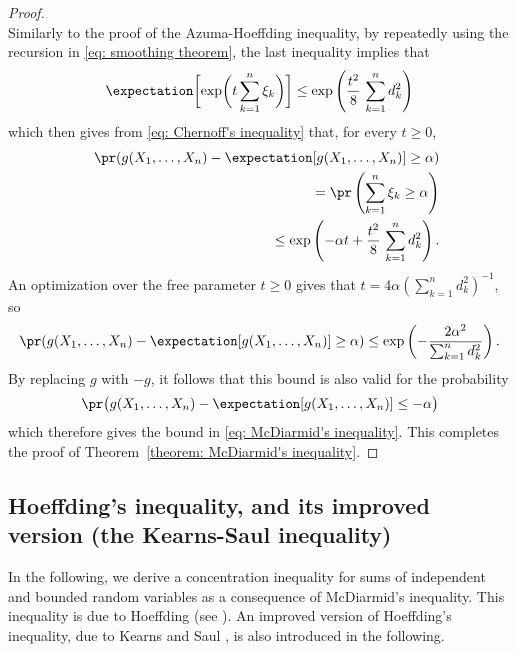 \documentclass{article}
\theoremstyle{plain}
\begin{document}
\begin{proof}
\begin{equation*}
\end{equation*}
Similarly to the proof of the Azuma-Hoeffding inequality, by repeatedly using
the recursion in \eqref{eq: smoothing theorem}, the last inequality implies that
\begin{equation}
\expectation \biggl[ \exp \biggl(t \sum_{k=1}^n \xi_k \biggr)
\biggr] \leq \exp \left(\frac{t^2}{8} \, \sum_{k=1}^n d_k^2 \right)
\end{equation}
which then gives from \eqref{eq: Chernoff's inequality} that, for every $t \geq 0$,
\begin{eqnarray}
&& \pr(g(X_1, \ldots, X_n) - \expectation[g(X_1, \ldots, X_n)] \geq \alpha) \nonumber \\
&& = \pr\left( \sum_{k=1}^n \xi_k \geq \alpha \right) \nonumber \\
&& \leq \exp\left(-\alpha t + \frac{t^2}{8} \, \sum_{k=1}^n d_k^2 \right).
\end{eqnarray}
An optimization over the free parameter $t \geq 0$ gives that
$t = 4\alpha \left(\sum_{k=1}^n d_k^2\right)^{-1}$, so
\begin{equation}
\pr(g(X_1, \ldots, X_n) - \expectation[g(X_1, \ldots, X_n)] \geq \alpha)
\leq \exp \left(-\frac{2 \alpha^2}{\sum_{k=1}^n d_k^2} \right).
\label{eq: one-sided McDiarmid's inequality}
\end{equation}
By replacing $g$ with $-g$, it follows that this bound is also valid for the probability
$$\pr\bigl(g(X_1, \ldots, X_n) - \expectation[g(X_1, \ldots, X_n)] \leq -\alpha \bigr)$$
which therefore gives the bound in \eqref{eq: McDiarmid's inequality}. This completes the
proof of Theorem~\ref{theorem: McDiarmid's inequality}.
\end{proof}

\subsection{Hoeffding's inequality, and its improved version (the Kearns-Saul inequality)}

In the following, we derive a concentration inequality for sums of independent and bounded
random variables as a consequence of McDiarmid's inequality. This inequality is due to
Hoeffding (see \cite[Theorem~2]{Hoeffding}). An improved version of Hoeffding's inequality,
due to Kearns and Saul \cite{KS_1998}, is also introduced in the following.
\end{document}
